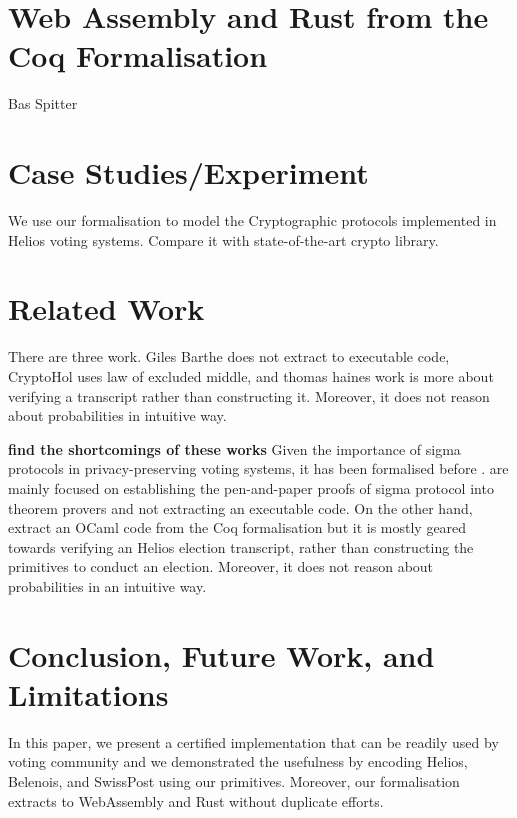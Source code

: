 \documentclass[conference,compsoc]{IEEEtran}
\begin{document}
\section{Web Assembly and Rust from the Coq Formalisation}
  Bas Spitter


\section{Case Studies/Experiment}
  We use our formalisation to model the Cryptographic protocols implemented in 
  Helios voting systems. Compare it with state-of-the-art 
  crypto library. 


\section{Related Work}
  There are three work. Giles Barthe does not extract to executable code, 
  CryptoHol uses law of excluded middle, and thomas haines work is more about 
  verifying a transcript rather than constructing it. Moreover, 
  it does not reason about probabilities in intuitive way. 

\textbf{find the shortcomings of these works}
Given the importance of sigma protocols in privacy-preserving voting systems,
it has been formalised before  \cite{5552642,butler2019formalisation,10.1145/3319535.3354247}. 
\cite{5552642,butler2019formalisation} are mainly focused on establishing the 
pen-and-paper proofs of sigma protocol into theorem provers and not extracting an executable code.
On the other hand, \cite{10.1145/3319535.3354247} extract an OCaml code from the Coq 
formalisation but it is mostly geared towards verifying an Helios election transcript, 
rather than constructing the primitives to conduct an election. Moreover, 
it does not reason about probabilities in an intuitive way.


\section{Conclusion, Future Work, and Limitations}
  In this paper, we present a certified implementation 
  that can be readily used by voting community and 
  we demonstrated the usefulness by encoding Helios, 
  Belenois, and SwissPost using our primitives. 
  Moreover, our formalisation extracts to WebAssembly and 
  Rust without duplicate efforts. 









\end{document}
